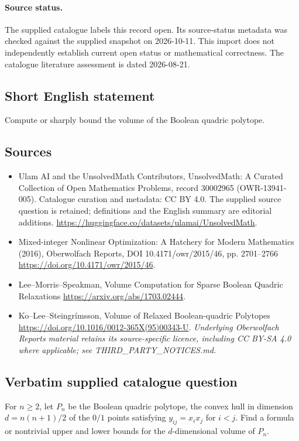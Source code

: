 \documentclass[11pt]{article}
\begin{document}
\paragraph{Source status.}
The supplied catalogue labels this record open. Its source-status metadata was checked against the supplied snapshot on 2026-10-11. This import does not independently establish current open status or mathematical correctness. The catalogue literature assessment is dated 2026-08-21.
\subsection{Short English statement}
Compute or sharply bound the volume of the Boolean quadric polytope.
\subsection{Sources}
\begin{itemize}
\item[S1] Ulam AI and the UnsolvedMath Contributors, UnsolvedMath: A Curated Collection of Open Mathematics Problems, record 30002965 (OWR-13941-005). Catalogue curation and metadata: CC BY 4.0. The supplied source question is retained; definitions and the English summary are editorial additions.
\url{https://huggingface.co/datasets/ulamai/UnsolvedMath}.
\item[S2] Mixed-integer Nonlinear Optimization: A Hatchery for Modern Mathematics (2016), Oberwolfach Reports, DOI 10.4171/owr/2015/46, pp. 2701--2766
\url{https://doi.org/10.4171/owr/2015/46}.
\item[S3] Lee--Morris--Speakman, Volume Computation for Sparse Boolean Quadric Relaxations
\url{https://arxiv.org/abs/1703.02444}.
\item[S4] Ko--Lee--Steingrímsson, Volume of Relaxed Boolean-quadric Polytopes
\url{https://doi.org/10.1016/0012-365X(95)00343-U}.
\textit{Underlying Oberwolfach Reports material retains its source-specific licence, including CC BY-SA 4.0 where applicable; see THIRD\_PARTY\_NOTICES.md.}
\end{itemize}
\subsection{Verbatim supplied catalogue question}
For $n\geq2$, let $P_n$ be the Boolean quadric polytope, the convex hull in dimension $d=n(n+1)/2$ of the $0/1$ points satisfying $y_{ij}=x_ix_j$ for $i<j$. Find a formula or nontrivial upper and lower bounds for the $d$-dimensional volume of $P_n$.
\end{document}
